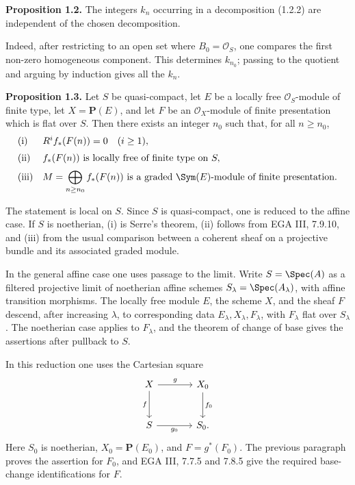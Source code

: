 \textbf{Proposition 1.2.} The integers \(k_n\) occurring in a decomposition (1.2.2) are independent of the chosen decomposition.

Indeed, after restricting to an open set where \(B_0=\mathcal O_S\), one compares the first non-zero homogeneous component. This determines \(k_{n_0}\); passing to the quotient and arguing by induction gives all the \(k_n\).

\textbf{Proposition 1.3.} Let \(S\) be quasi-compact, let \(E\) be a locally free \(\mathcal O_S\)-module of finite type, let \(X=\mathbf P(E)\), and let \(F\) be an \(\mathcal O_X\)-module of finite presentation which is flat over \(S\). Then there exists an integer \(n_0\) such that, for all \(n\geq n_0\),
\[
\begin{array}{ll}
\text{\rm (i)}& R^i f_*(F(n))=0\quad (i\geq 1),\\[2mm]
\text{\rm (ii)}& f_*(F(n))\text{ is locally free of finite type on }S,\\[2mm]
\text{\rm (iii)}& \displaystyle M=\bigoplus_{n\geq n_0} f_*(F(n))
\text{ is a graded }\Sym(E)\text{-module of finite presentation.}
\end{array}
\]

The statement is local on \(S\). Since \(S\) is quasi-compact, one is reduced to the affine case. If \(S\) is noetherian, (i) is Serre's theorem, (ii) follows from EGA III, 7.9.10, and (iii) from the usual comparison between a coherent sheaf on a projective bundle and its associated graded module.

In the general affine case one uses passage to the limit. Write \(S=\Spec(A)\) as a filtered projective limit of noetherian affine schemes \(S_\lambda=\Spec(A_\lambda)\), with affine transition morphisms. The locally free module \(E\), the scheme \(X\), and the sheaf \(F\) descend, after increasing \(\lambda\), to corresponding data \(E_\lambda,X_\lambda,F_\lambda\), with \(F_\lambda\) flat over \(S_\lambda\). The noetherian case applies to \(F_\lambda\), and the theorem of change of base gives the assertions after pullback to \(S\).

In this reduction one uses the Cartesian square
\[
\begin{tikzcd}[column sep=large,row sep=large]
X \arrow[r,"g"] \arrow[d,"f"'] & X_0 \arrow[d,"f_0"]\\
S \arrow[r,"g_0"'] & S_0 .
\end{tikzcd}
\]
Here \(S_0\) is noetherian, \(X_0=\mathbf P(E_0)\), and \(F=g^*(F_0)\). The previous paragraph proves the assertion for \(F_0\), and EGA III, 7.7.5 and 7.8.5 give the required base-change identifications for \(F\).

